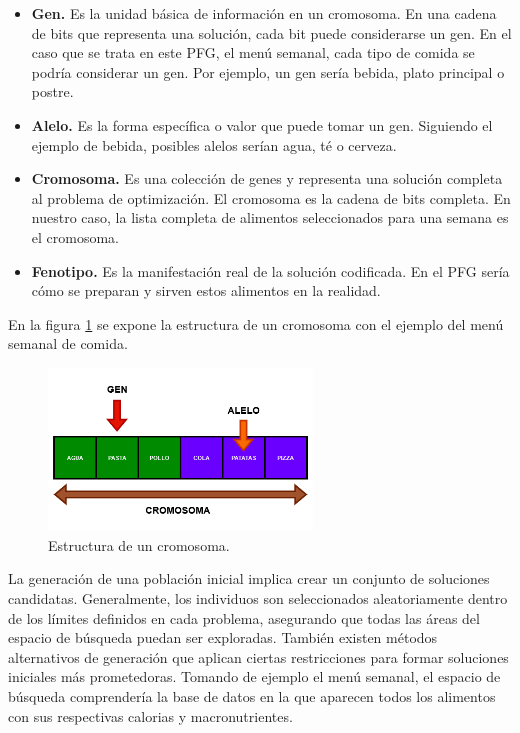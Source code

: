 \begin{itemize}
    \item \textbf{Gen.} Es la unidad básica de información en un cromosoma. En una cadena de bits que representa una solución, cada bit puede considerarse un gen. En el caso que se trata en este PFG, el menú semanal, cada tipo de comida se podría considerar un gen. Por ejemplo, un gen sería bebida, plato principal o postre.
    \item \textbf{Alelo.} Es la forma específica o valor que puede tomar un gen. Siguiendo el ejemplo de bebida, posibles alelos serían agua, té o cerveza.
    \item \textbf{Cromosoma.} Es una colección de genes y representa una solución completa al problema de optimización. El cromosoma es la cadena de bits completa. En nuestro caso, la lista completa de alimentos seleccionados para una semana es el cromosoma. 
    \item \textbf{Fenotipo.} Es la manifestación real de la solución codificada. En el PFG sería cómo se preparan y sirven estos alimentos en la realidad.
\end{itemize}

En la figura \ref{fig:cromosoma} se expone la estructura de un cromosoma con el ejemplo del menú semanal de comida.

\begin{figure}[H]
  \centering
  \includegraphics[width=0.625\textwidth]{figures/cromosoma.png}
  \caption{Estructura de un cromosoma.}
  \label{fig:cromosoma}
\end{figure}

La generación de una población inicial implica crear un conjunto de soluciones candidatas. Generalmente, los individuos son seleccionados aleatoriamente dentro de los límites definidos en cada problema, asegurando que todas las áreas del espacio de búsqueda puedan ser exploradas. También existen métodos alternativos de generación que aplican ciertas restricciones para formar soluciones iniciales más prometedoras. Tomando de ejemplo el menú semanal, el espacio de búsqueda comprendería la base de datos en la que aparecen todos los alimentos con sus respectivas calorias y macronutrientes. 

